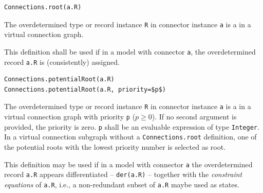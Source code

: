 \begin{operatordefinition}
\begin{synopsis}\begin{lstlisting}
Connections.root(a.R)
\end{lstlisting}\end{synopsis}
\begin{semantics}
The overdetermined type or record instance \lstinline!R! in connector instance \lstinline!a! is a  in a virtual connection graph.

\begin{nonnormative}
This definition shall be used if in a model with connector \lstinline!a!, the overdetermined record \lstinline!a.R! is (consistently) assigned.
\end{nonnormative}
\end{semantics}
\end{operatordefinition}

\begin{operatordefinition}
\begin{synopsis}\begin{lstlisting}
Connections.potentialRoot(a.R)
Connections.potentialRoot(a.R, priority=$p$)
\end{lstlisting}\end{synopsis}
\begin{semantics}
The overdetermined type or record instance \lstinline!R! in connector instance \lstinline!a! is a  in a virtual connection graph with priority \lstinline!p! ($p \geq 0$).
If no second argument is provided, the priority is zero.
\lstinline!p! shall be an evaluable expression of type \lstinline!Integer!.
In a virtual connection subgraph without a \lstinline!Connections.root! definition, one of the potential roots with the lowest priority number is selected as root.

\begin{nonnormative}
This definition may be used if in a model with connector \lstinline!a! the overdetermined record \lstinline!a.R! appears differentiated -- \lstinline!der(a.R)! -- together with the \emph{constraint equations} of \lstinline!a.R!, i.e., a non-redundant subset of \lstinline!a.R! maybe used as states.
\end{nonnormative}
\end{semantics}
\end{operatordefinition}

